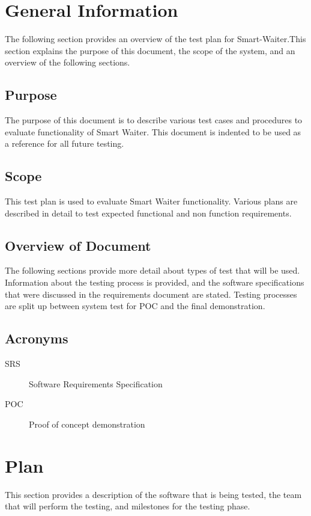 \documentclass[12pt]{article}
\begin{document}
%
%

\section{General Information}
The following section provides an overview of the test plan 
for Smart-Waiter.This section explains the purpose of this document, the scope of the system, and an overview of the following sections.

\subsection{Purpose}
The purpose of this document is to describe  various test cases and procedures to evaluate functionality of Smart Waiter.
This document is indented to be used as a reference for all future testing. 

\subsection{Scope}
This test plan is used to evaluate Smart Waiter functionality. Various plans are described in detail to test expected functional and non function requirements.  

\subsection{Overview of Document }
The following sections provide more detail about types of test that will be used. Information about the testing process is provided, and the software specifications
that were discussed in the requirements document are stated. Testing processes are split up between system test for POC and the final demonstration. 

\subsection{Acronyms}
\begin{description}
\item[SRS] Software Requirements Specification
\item[POC] Proof of concept demonstration
\end{description}

%
%

\section{Plan}
This section provides a description of the software that is being tested, the team that will
perform the testing, and milestones for the testing phase.
\end{document}
